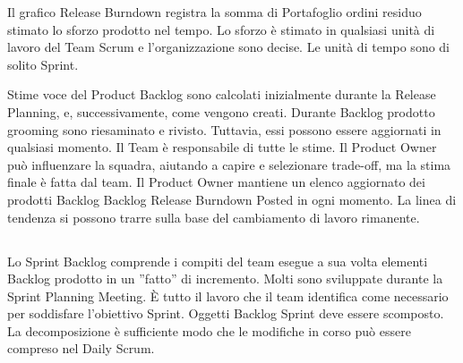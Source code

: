 Il grafico Release Burndown registra la somma di Portafoglio ordini residuo stimato lo sforzo prodotto nel tempo. Lo
sforzo \`e stimato in qualsiasi unit\`a di lavoro del Team Scrum e l'organizzazione sono decise. Le unit\`a di tempo
sono di solito Sprint.\\ 
\linebreak

Stime voce del Product Backlog sono calcolati inizialmente durante la Release Planning, e, successivamente, come
vengono creati. Durante Backlog prodotto grooming sono riesaminato e rivisto. Tuttavia, essi possono essere aggiornati
in qualsiasi momento. Il Team \`e responsabile di tutte le stime. Il Product Owner pu\`o influenzare la squadra,
aiutando a capire e selezionare trade-off, ma la stima finale \`e fatta dal team. Il Product Owner mantiene un elenco
aggiornato dei prodotti Backlog Backlog Release Burndown Posted in ogni momento. La linea di tendenza si possono trarre
sulla base del cambiamento di lavoro rimanente.

\vspace{0.4cm}
\vspace{0.4cm}
\linebreak

\subsection*{\color{Blue}{SPRINT BACKLOG E SPRINT BURNDOWN}}
\label{sec:sprintbacklog}
Lo Sprint Backlog comprende i compiti del team esegue a sua volta elementi Backlog prodotto in un ''fatto'' di
incremento. Molti sono sviluppate durante la Sprint Planning Meeting. \`E tutto il lavoro che il team identifica come
necessario per soddisfare l'obiettivo Sprint. Oggetti Backlog Sprint deve essere scomposto. La decomposizione \`e
sufficiente modo che le modifiche in corso pu\`o essere compreso nel Daily Scrum.

\vspace{0.4cm}
\vspace{0.4cm}
\linebreak

